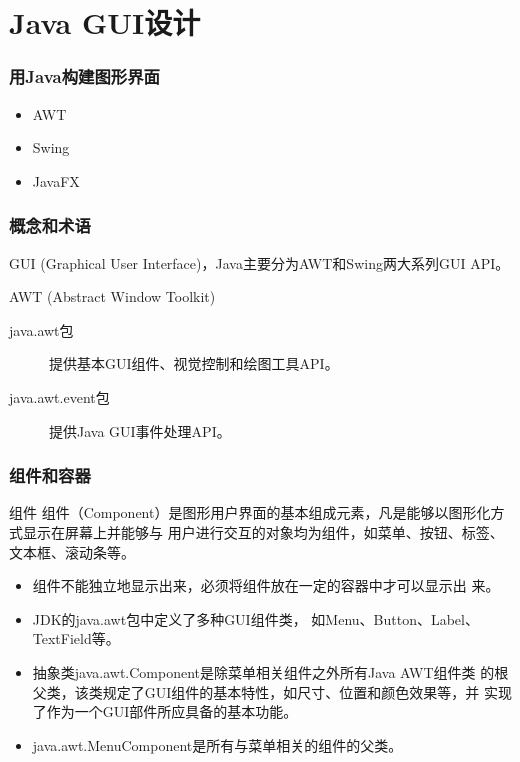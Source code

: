 \section{Java GUI设计}

\begin{frame}[fragile]
  \frametitle{用Java构建图形界面}

  \begin{itemize}
  \item AWT
  \item Swing
  \item JavaFX
  \end{itemize}
\end{frame}

\begin{frame}[fragile] %
  \frametitle{概念和术语}


  GUI (Graphical User Interface)，Java主要分为AWT和Swing两大系列GUI API。


  AWT (Abstract Window Toolkit)


  \begin{description}
  \item[java.awt包] 提供基本GUI组件、视觉控制和绘图工具API。
  \item[java.awt.event包] 提供Java GUI事件处理API。
  \end{description}
\end{frame}

\begin{frame}[fragile] %
  \frametitle{组件和容器}
  
  \begin{block}{组件}
    组件（Component）是图形用户界面的基本组成元素，凡是能够以图形化方式显示在屏幕上并能够与
    用户进行交互的对象均为组件，如菜单、按钮、标签、文本框、滚动条等。
  \end{block}

  \pause
  
  \begin{itemize}[<+-|alert@+>]\kai
  \item 组件不能独立地显示出来，必须将组件放在一定的容器中才可以显示出
    来。
  \item JDK的java.awt包中定义了多种GUI组件类，
    如Menu、Button、Label、TextField等。
  \item 抽象类java.awt.Component是除菜单相关组件之外所有Java AWT组件类
    的根父类，该类规定了GUI组件的基本特性，如尺寸、位置和颜色效果等，并
    实现了作为一个GUI部件所应具备的基本功能。
  \item java.awt.MenuComponent是所有与菜单相关的组件的父类。
  \end{itemize}
\end{frame}

